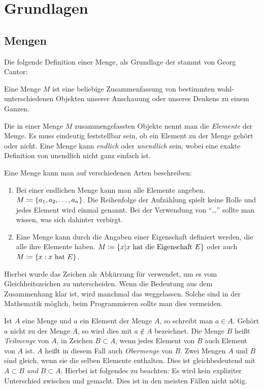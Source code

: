 \part{Grundlagen}
\chapter{Mengen}
Die folgende Definition einer Menge, als Grundlage der  stammt von Georg Cantor:
\begin{definition}
Eine Menge $M$ ist eine beliebige Zusammenfassung von bestimmten wohl-unterschiedenen Objekten unserer Anschauung oder unseres Denkens zu einem Ganzen.
\end{definition}

\begin{note}
Die in einer Menge $M$ zusammengefassten Objekte nennt man die \emph{Elemente} der Menge. Es muss eindeutig feststellbar sein, ob ein Element zu der Menge gehört oder nicht. Eine Menge kann \emph{endlich} oder \emph{unendlich} sein, wobei eine exakte Definition von unendlich nicht ganz einfach ist.
\end{note}

Eine Menge kann man auf verschiedenen Arten beschreiben:
\begin{enumerate}
\item Bei einer endlichen Menge kann man alle Elemente angeben. $M \mathrel{\mathop:\!\!=} \left\{a_1, a_2, \dots, a_n\right\}$. Die Reihenfolge der Aufzählung spielt keine Rolle und jedes Element wird einmal genannt. Bei der Verwendung von \enquote{\dots} sollte man wissen, was sich dahinter verbirgt.
\item Eine Menge kann durch die Angaben einer Eigenschaft definiert werden, die alle ihre Elemente haben. $M \mathrel{\mathop:\!\!=} \left\{x \vert x \text{ hat die Eigenschaft } E\right\}$ oder auch $M \mathrel{\mathop:\!\!=} \left\{x : x \text{ hat } E\right\}$.
\end{enumerate}

Hierbei wurde das Zeichen \enq{$\ceq$} als Abkürzung für  verwendet, um es vom Gleichheitszeichen \enq{$=$} zu unterscheiden. Wenn die Bedeutung aus dem Zusammenhang klar ist, wird manchmal das \enq{$:$} weggelassen. Solche  sind in der Mathematik möglich, beim Programmieren sollte man dies vermeiden.

Ist $A$ eine Menge und $a$ ein Element der Menge $A$, so schreibt man $a \in A$. Gehört $a$ nicht zu der Menge $A$, so wird dies mit $a \notin A$ bezeichnet. Die Menge $B$ heißt \emph{Teilmenge} von $A$, in Zeichen $B \subset A$, wenn jedes Element von $B$ auch Element von $A$ ist. $A$ heißt in diesem Fall auch \emph{Obermenge} von $B$. Zwei Mengen $A$ und $B$ sind gleich, wenn sie die selben Elemente enthalten. Dies ist gleichbedeutend mit $A \subset B$ \emph{und} $B \subset A$. Hierbei ist folgendes zu beachten: Es wird kein expliziter Unterschied zwischen \enq{$\subset$} und \enq{$\subseteq$} gemacht. Dies ist in den meisten Fällen nicht nötig.

